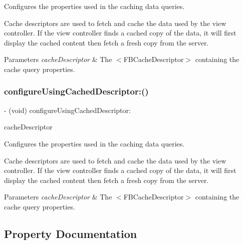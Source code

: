 Configures the properties used in the caching data queries.

Cache descriptors are used to fetch and cache the data used by the view controller. If the view controller finds a cached copy of the data, it will first display the cached content then fetch a fresh copy from the server.


\begin{DoxyParams}{Parameters}
{\em cache\+Descriptor} & The $<$\+F\+B\+Cache\+Descriptor$>$ containing the cache query properties. \\
\hline
\end{DoxyParams}
\mbox{\label{interfaceFBFriendPickerViewController_aec8ccc14e83ba67dfebf0ffcc09253f8}} 
\subsubsection{\texorpdfstring{configure\+Using\+Cached\+Descriptor\+:()}{configureUsingCachedDescriptor:()}\hspace{0.1cm}{\footnotesize\ttfamily [5/5]}}
{\footnotesize\ttfamily -\/ (void) configure\+Using\+Cached\+Descriptor\+: \begin{DoxyParamCaption}\item[{(\hyperlink{interfaceFBCacheDescriptor}{F\+B\+Cache\+Descriptor} $\ast$)}]{cache\+Descriptor }\end{DoxyParamCaption}}

Configures the properties used in the caching data queries.

Cache descriptors are used to fetch and cache the data used by the view controller. If the view controller finds a cached copy of the data, it will first display the cached content then fetch a fresh copy from the server.


\begin{DoxyParams}{Parameters}
{\em cache\+Descriptor} & The $<$\+F\+B\+Cache\+Descriptor$>$ containing the cache query properties. \\
\hline
\end{DoxyParams}


\subsection{Property Documentation}
\mbox{\label{interfaceFBFriendPickerViewController_a161cab82f17247a9ad90828ef6ab5aa5}} 
